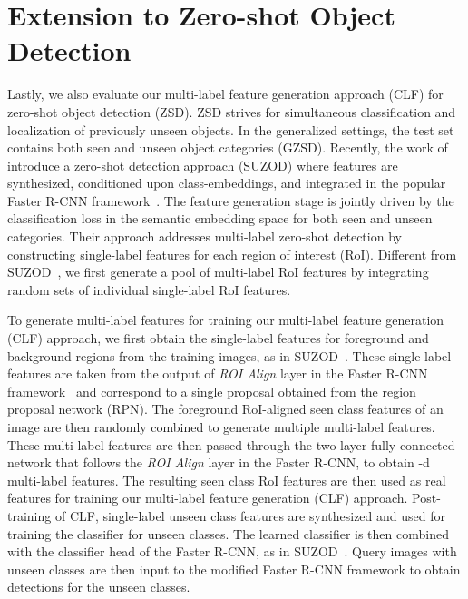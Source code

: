 \documentclass[10pt,journal,compsoc]{IEEEtran}
\begin{document}
\section{Extension to Zero-shot Object Detection\label{sec:obj_det}}
Lastly, we also evaluate our multi-label feature generation approach (CLF) for zero-shot object detection (ZSD). ZSD strives for simultaneous classification and localization of previously unseen objects. In the generalized settings, the test set contains both seen and unseen object categories (GZSD). Recently, the work of~\cite{hayat2020synthesizing} introduce a zero-shot detection approach (SUZOD) where features are synthesized, conditioned upon class-embeddings, and integrated in the popular Faster R-CNN framework~\cite{ren2015faster}. The feature generation stage is jointly driven by the classification loss in the semantic embedding space for both seen and unseen categories. Their approach addresses multi-label zero-shot detection by constructing single-label features for each region of interest (RoI). Different from SUZOD~\cite{hayat2020synthesizing}, we first generate a pool of multi-label RoI features by integrating random sets of individual single-label RoI features. 


To generate multi-label features for training our multi-label feature generation (CLF) approach, we first obtain the single-label features for foreground and background regions from the training images, as in SUZOD~\cite{hayat2020synthesizing}. These single-label features are taken from the output of \textit{ROI Align} layer in the Faster R-CNN framework~\cite{ren2015faster} and correspond to a single proposal obtained from the region proposal network (RPN). The foreground RoI-aligned seen class features of an image are then randomly combined to generate multiple multi-label features. These multi-label features are then passed through the two-layer fully connected network that follows the \textit{ROI Align} layer in the Faster R-CNN, to obtain -d multi-label features. The resulting seen class RoI features are then used as real features for training our multi-label feature generation (CLF) approach. Post-training of CLF, single-label unseen class features are synthesized and used for training the classifier for unseen classes. The learned classifier is then combined with the classifier head of the Faster R-CNN, as in SUZOD~\cite{hayat2020synthesizing}. Query images with unseen classes are then input to the modified Faster R-CNN framework to obtain detections for the unseen classes. 
\end{document}

